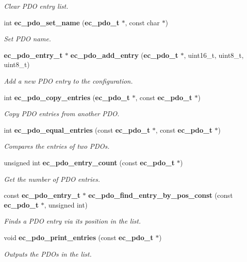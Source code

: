 \begin{DoxyCompactItemize}
\begin{DoxyCompactList}\small\item\em Clear P\-D\-O entry list. \end{DoxyCompactList}\item 
int {\bf ec\-\_\-pdo\-\_\-set\-\_\-name} ({\bf ec\-\_\-pdo\-\_\-t} $\ast$, const char $\ast$)
\begin{DoxyCompactList}\small\item\em Set P\-D\-O name. \end{DoxyCompactList}\item 
{\bf ec\-\_\-pdo\-\_\-entry\-\_\-t} $\ast$ {\bf ec\-\_\-pdo\-\_\-add\-\_\-entry} ({\bf ec\-\_\-pdo\-\_\-t} $\ast$, uint16\-\_\-t, uint8\-\_\-t, uint8\-\_\-t)
\begin{DoxyCompactList}\small\item\em Add a new P\-D\-O entry to the configuration. \end{DoxyCompactList}\item 
int {\bf ec\-\_\-pdo\-\_\-copy\-\_\-entries} ({\bf ec\-\_\-pdo\-\_\-t} $\ast$, const {\bf ec\-\_\-pdo\-\_\-t} $\ast$)
\begin{DoxyCompactList}\small\item\em Copy P\-D\-O entries from another P\-D\-O. \end{DoxyCompactList}\item 
int {\bf ec\-\_\-pdo\-\_\-equal\-\_\-entries} (const {\bf ec\-\_\-pdo\-\_\-t} $\ast$, const {\bf ec\-\_\-pdo\-\_\-t} $\ast$)
\begin{DoxyCompactList}\small\item\em Compares the entries of two P\-D\-Os. \end{DoxyCompactList}\item 
unsigned int {\bf ec\-\_\-pdo\-\_\-entry\-\_\-count} (const {\bf ec\-\_\-pdo\-\_\-t} $\ast$)
\begin{DoxyCompactList}\small\item\em Get the number of P\-D\-O entries. \end{DoxyCompactList}\item 
const {\bf ec\-\_\-pdo\-\_\-entry\-\_\-t} $\ast$ {\bf ec\-\_\-pdo\-\_\-find\-\_\-entry\-\_\-by\-\_\-pos\-\_\-const} (const {\bf ec\-\_\-pdo\-\_\-t} $\ast$, unsigned int)
\begin{DoxyCompactList}\small\item\em Finds a P\-D\-O entry via its position in the list. \end{DoxyCompactList}\item 
void {\bf ec\-\_\-pdo\-\_\-print\-\_\-entries} (const {\bf ec\-\_\-pdo\-\_\-t} $\ast$)\label{pdo_8h_ada7e926581a6a55fad6714a498297192}

\begin{DoxyCompactList}\small\item\em Outputs the P\-D\-Os in the list. \end{DoxyCompactList}\end{DoxyCompactItemize}


